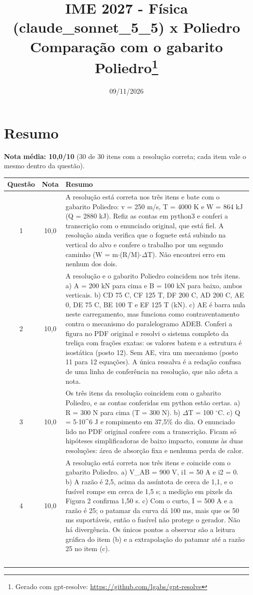 \documentclass{article}%
\title{IME 2027 {-} Física (claude\_sonnet\_5\_5) x Poliedro\\[4pt]\large Comparação com o gabarito Poliedro\thanks{Gerado com gpt-resolve: \url{https://github.com/lgabs/gpt-resolve}}}%
\date{09/11/2026}%
\begin{document}
%
\normalsize%
\maketitle%
\section*{Resumo}\textbf{Nota média: 10,0/10} (30 de 30 itens com a resolução correta; cada item vale o mesmo dentro da questão).\par\medskip%
\begin{longtable}{@{}c c p{}@{}}\toprule Questão & Nota & Resumo \\ \midrule
1 & 10,0 & A resolução está correta nos três itens e bate com o gabarito Poliedro: v = 250 m/s, T = 4000 K e W = 864 kJ (Q = 2880 kJ). Refiz as contas em python3 e conferi a transcrição com o enunciado original, que está fiel. A resolução ainda verifica que o foguete está subindo na vertical do alvo e confere o trabalho por um segundo caminho (W = m$\cdot$(R/M)$\cdot$$\Delta$T). Não encontrei erro em nenhum dos dois. \\
2 & 10,0 & A resolução e o gabarito Poliedro coincidem nos três itens. a) A = 200 kN para cima e B = 100 kN para baixo, ambos verticais. b) CD 75 C, CF 125 T, DF 200 C, AD 200 C, AE 0, DE 75 C, BE 100 T e EF 125 T (kN). c) AE é barra nula neste carregamento, mas funciona como contraventamento contra o mecanismo do paralelogramo ADEB. Conferi a figura no PDF original e resolvi o sistema completo da treliça com frações exatas: os valores batem e a estrutura é isostática (posto 12). Sem AE, vira um mecanismo (posto 11 para 12 equações). A única ressalva é a redação confusa de uma linha de conferência na resolução, que não afeta a nota. \\
3 & 10,0 & Os três itens da resolução coincidem com o gabarito Poliedro, e as contas conferidas em python estão certas. a) R = 300 N para cima (T = 300 N). b) $\Delta$T = 100 $^\circ$C. c) Q = 5$\cdot$10\^{}6 J e rompimento em 37,5\% do dia. O enunciado lido no PDF original confere com a transcrição. Ficam só hipóteses simplificadoras de baixo impacto, comuns às duas resoluções: área de absorção fixa e nenhuma perda de calor. \\
4 & 10,0 & A resolução está correta nos três itens e coincide com o gabarito Poliedro. a) V\_AB = 900 V, i1 = 50 A e i2 = 0. b) A razão é 2,5, acima da assíntota de cerca de 1,1, e o fusível rompe em cerca de 1,5 s; a medição em pixels da Figura 2 confirma 1,50 s. c) Com o curto, I = 500 A e a razão é 25; o patamar da curva dá 100 ms, mais que os 50 ms suportáveis, então o fusível não protege o gerador. Não há divergência. Os únicos pontos a observar são a leitura gráfica do item (b) e a extrapolação do patamar até a razão 25 no item (c). \\
$$
\end{longtable}
\end{document}

